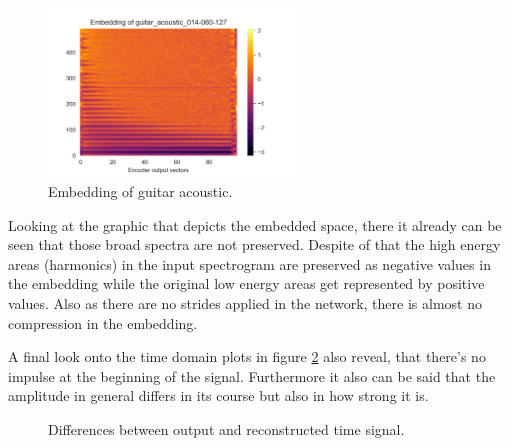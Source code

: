 \begin{figure}[htb!]
    \centering
    \includegraphics[width=0.60\textwidth]{images/results/emb_guitar_acoustic_014-060-127.png}
    \caption{Embedding of guitar acoustic.}
    \label{fig:res_1D_emb}
\end{figure}

Looking at the graphic that depicts the embedded space, there it already can be seen that those broad spectra are not preserved. Despite of that the high energy areas (harmonics) in the input spectrogram are preserved as negative values in the embedding while the original low energy areas get represented by positive values. Also as there are no strides applied in the network, there is almost no compression in the embedding.

A final look onto the time domain plots in figure \ref{fig:res_1D_input_output_sig} also reveal, that there's no impulse at the beginning of the signal. Furthermore it also can be said that the amplitude in general differs in its course but also in how strong it is.

\begin{figure}[htb!]
    \centering
    \caption{Differences between output and reconstructed time signal.}
    \label{fig:res_1D_input_output_sig}
\end{figure}


